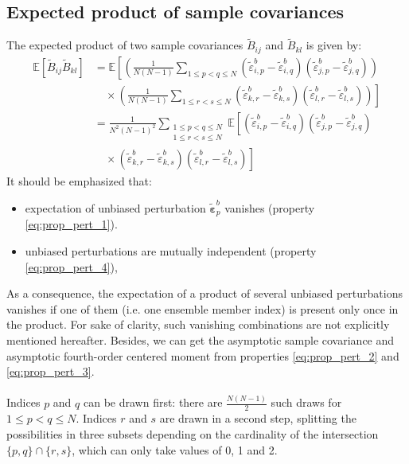\documentclass[12pt]{scrartcl}
\begin{document}
\subsection{Expected product of sample covariances}
The expected product of two sample covariances $\widetilde{B}_{ij}$ and $\widetilde{B}_{kl}$ is given by:
\begin{align}
\mathbb{E} \left[\widetilde{B}_{ij} \widetilde{B}_{kl}\right] & = \mathbb{E}\left[\left(\frac{1}{N(N-1)} \sum_{1 \le p < q \le N} \left(\widetilde{\varepsilon}^b_{i,p} - \widetilde{\varepsilon}^b_{i,q}\right) \left(\widetilde{\varepsilon}^b_{j,p} - \widetilde{\varepsilon}^b_{j,q}\right)\right) \right. \nonumber \\
& \left. \quad \times \left(\frac{1}{N(N-1)} \sum_{1 \le r < s \le N} \left(\widetilde{\varepsilon}^b_{k,r} - \widetilde{\varepsilon}^b_{k,s}\right) \left(\widetilde{\varepsilon}^b_{l,r} - \widetilde{\varepsilon}^b_{l,s}\right)\right) \right] \nonumber \\
& = \frac{1}{N^2(N-1)^2} \sum_{\substack{1 \le p < q \le N\\1 \le r < s \le N}} \mathbb{E}\left[\left(\widetilde{\varepsilon}^b_{i,p} - \widetilde{\varepsilon}^b_{i,q}\right) \left(\widetilde{\varepsilon}^b_{j,p} - \widetilde{\varepsilon}^b_{j,q}\right) \right. \nonumber \\
& \left. \quad \times \left(\widetilde{\varepsilon}^b_{k,r} - \widetilde{\varepsilon}^b_{k,s}\right) \left(\widetilde{\varepsilon}^b_{l,r} - \widetilde{\varepsilon}^b_{l,s}\right) \right]
\end{align}
It should be emphasized that:
\begin{itemize}
\item expectation of unbiased perturbation $\widetilde{\boldsymbol{\varepsilon}}^b_p$ vanishes (property \eqref{eq:prop_pert_1}).
\item unbiased perturbations are mutually independent (property \eqref{eq:prop_pert_4}),
\end{itemize}
As a consequence, the expectation of a product of several unbiased perturbations vanishes if one of them (i.e. one ensemble member index) is present only once in the product. For sake of clarity, such vanishing combinations are not explicitly mentioned hereafter. Besides, we can get the asymptotic sample covariance and asymptotic fourth-order centered moment from properties \eqref{eq:prop_pert_2} and \eqref{eq:prop_pert_3}.\\
$  $\\
Indices $p$ and $q$ can be drawn first: there are $\displaystyle \frac{N(N-1)}{2}$ such draws for $1 \le p < q \le N$. Indices $r$ and $s$ are drawn in a second step, splitting the possibilities in three subsets depending on the cardinality of the intersection $\{p,q\} \cap \{r,s\}$, which can only take values of 0, 1 and 2.
\end{document}
